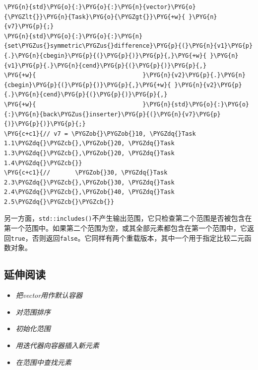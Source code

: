 \begin{itemize}
\begin{codeblockbg}
\begin{Verbatim}[commandchars=\\\{\},breaklines=true,breakanywhere=true,fontsize=\codefont,xleftmargin=17bp]
\PYG{n}{std}\PYG{o}{:}\PYG{o}{:}\PYG{n}{vector}\PYG{o}{\PYGZlt{}}\PYG{n}{Task}\PYG{o}{\PYGZgt{}}\PYG{+w}{ }\PYG{n}{v7}\PYG{p}{;}
\PYG{n}{std}\PYG{o}{:}\PYG{o}{:}\PYG{n}{set\PYGZus{}symmetric\PYGZus{}difference}\PYG{p}{(}\PYG{n}{v1}\PYG{p}{.}\PYG{n}{cbegin}\PYG{p}{(}\PYG{p}{)}\PYG{p}{,}\PYG{+w}{ }\PYG{n}{v1}\PYG{p}{.}\PYG{n}{cend}\PYG{p}{(}\PYG{p}{)}\PYG{p}{,}
\PYG{+w}{                              }\PYG{n}{v2}\PYG{p}{.}\PYG{n}{cbegin}\PYG{p}{(}\PYG{p}{)}\PYG{p}{,}\PYG{+w}{ }\PYG{n}{v2}\PYG{p}{.}\PYG{n}{cend}\PYG{p}{(}\PYG{p}{)}\PYG{p}{,}
\PYG{+w}{                              }\PYG{n}{std}\PYG{o}{:}\PYG{o}{:}\PYG{n}{back\PYGZus{}inserter}\PYG{p}{(}\PYG{n}{v7}\PYG{p}{)}\PYG{p}{)}\PYG{p}{;}
\PYG{c+c1}{// v7 = \PYGZob{}\PYGZob{}10, \PYGZdq{}Task 1.1\PYGZdq{}\PYGZcb{},\PYGZob{}20, \PYGZdq{}Task 1.3\PYGZdq{}\PYGZcb{},\PYGZob{}20, \PYGZdq{}Task 1.4\PYGZdq{}\PYGZcb{}}
\PYG{c+c1}{//       \PYGZob{}30, \PYGZdq{}Task 2.3\PYGZdq{}\PYGZcb{},\PYGZob{}30, \PYGZdq{}Task 2.4\PYGZdq{}\PYGZcb{},\PYGZob{}40, \PYGZdq{}Task 2.5\PYGZdq{}\PYGZcb{}\PYGZcb{}}
\end{Verbatim}
\end{codeblockbg}

\end{itemize}



另一方面，\texttt{std::\allowbreak{}includes()}不产生输出范围，它只检查第二个范围是否被包含在第一个范围中。如果第二个范围为空，或其全部元素都包含在第一个范围中，它返回\texttt{true}，否则返回\texttt{false}。它同样有两个重载版本，其中一个用于指定比较二元函数对象。



\subsection{延伸阅读}



\begin{itemize}
\item \textit{把vector用作默认容器}



\item \textit{对范围排序}



\item \textit{初始化范围}



\item \textit{用迭代器向容器插入新元素}



\item \textit{在范围中查找元素}

\end{itemize}


